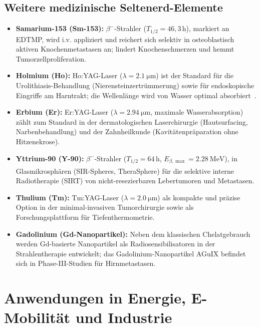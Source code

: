 ﻿\documentclass[12pt, a4paper]{report}
\theoremstyle{definition}
\theoremstyle{remark}
\begin{document}
\subsection{Weitere medizinische Seltenerd-Elemente}

\begin{itemize}
  \item \textbf{Samarium-153 (Sm-153):} $\beta^-$-Strahler ($T_{1/2}=46{,}3\,\text{h}$),
        markiert an EDTMP, wird i.v. appliziert und reichert sich selektiv in
        osteoblastisch aktiven Knochenmetastasen an; lindert Knochenschmerzen
        und hemmt Tumorzellproliferation.
  \item \textbf{Holmium (Ho):} Ho:YAG-Laser ($\lambda = \SI{2.1}{\micro\metre}$)
        ist der Standard für die Urolithiasis-Behandlung (Nierensteinzertrümmerung)
        sowie für endoskopische Eingriffe am Harntrakt; die Wellenlänge wird
        von Wasser optimal absorbiert~\cite{haxel2002}.
  \item \textbf{Erbium (Er):} Er:YAG-Laser ($\lambda = \SI{2.94}{\micro\metre}$,
        maximale Wasserabsorption) zählt zum Standard in der dermatologischen
        Laserchirurgie (Hautsurfacing, Narbenbehandlung) und der Zahnheilkunde
        (Kavitätenpräparation ohne Hitzenekrose).
  \item \textbf{Yttrium-90 (Y-90):} $\beta^-$-Strahler
        ($T_{1/2} = 64\,\text{h}$, $E_{\beta,\max} = \SI{2.28}{\mega\electronvolt}$),
        in Glasmikrosphären (SIR-Spheres\textsuperscript{\textregistered},
        TheraSphere\textsuperscript{\textregistered}) für die selektive interne
        Radiotherapie (SIRT) von nicht-resezierbaren Lebertumoren und Metastasen.
  \item \textbf{Thulium (Tm):} Tm:YAG-Laser ($\lambda = \SI{2.0}{\micro\metre}$)
        als kompakte und präzise Option in der minimal-invasiven Tumorchirurgie
        sowie als Forschungsplattform für Tiefenthermometrie.
  \item \textbf{Gadolinium (Gd-Nanopartikel):} Neben dem klassischen
        Chelatgebrauch werden Gd-basierte Nanopartikel als Radiosensibilisatoren
        in der Strahlentherapie entwickelt; das Gadolinium-Nanopartikel AGuIX
        befindet sich in Phase-III-Studien für Hirnmetastasen.
\end{itemize}

\section{Anwendungen in Energie, E-Mobilität und Industrie}
\label{ssec:re_energie}
\end{document}
